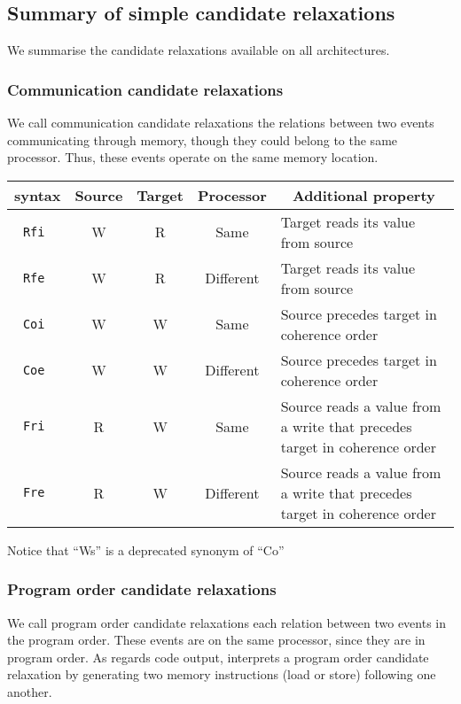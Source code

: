 \subsection{Summary of simple candidate relaxations}
We summarise the candidate relaxations available on all architectures.

\subsubsection{Communication\label{communication:cr} candidate relaxations}
We call communication candidate relaxations the relations between two events
communicating through memory, though they could belong to the same processor.
Thus, these events operate on the same memory location.
\begin{center}
\begin{tabular}{c|c|c|c|p{.4\linewidth}}
\diy{} syntax & Source & Target & Processor &
\multicolumn{1}{c}{Additional property}
\\\hline
\tt Rfi      & W      & R      & Same      &
Target reads its value from source \\\hline
\tt Rfe      & W      & R      & Different &
Target reads its value from source  \\\hline
\tt Coi      & W      & W      & Same      &
Source precedes target in coherence order
\\\hline
\tt Coe      & W      & W      & Different &
Source precedes target in coherence order \\\hline
\tt Fri     & R      & W      & Same      &
Source reads a value from a write that precedes target in coherence order
  \\\hline
\tt Fre  & R      & W      & Different &
Source reads a value from a write that precedes target in coherence order
\\\hline
\end{tabular}
\end{center}
Notice that ``Ws'' is a deprecated synonym of ``Co''

\subsubsection{Program order candidate relaxations}

We call program order candidate relaxations each relation
between two events in the
program order. These events are on the same processor, since they are in
program order.
As regards code output,
\diy{} interprets a program order candidate relaxation by generating
two memory instructions (load or store) following one another.

